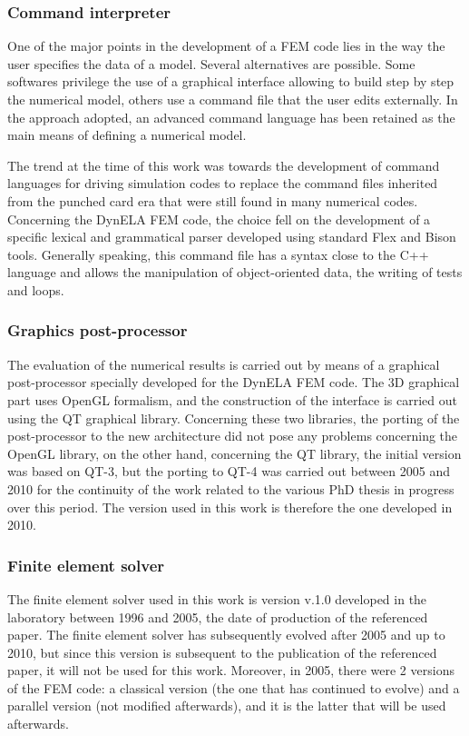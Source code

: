 \subsubsection{Command interpreter}
One of the major points in the development of a FEM code lies in the way the user specifies the data of a model. Several alternatives are possible. Some softwares privilege the use of a graphical interface allowing to build step by step the numerical model, others use a command file that the user edits externally. In the approach adopted, an advanced command language has been retained as the main means of defining a numerical model. 

The trend at the time of this work was towards the development of command languages for driving simulation codes to replace the command files inherited from the punched card era that were still found in many numerical codes. Concerning the DynELA FEM code, the choice fell on the development of a specific lexical and grammatical parser developed using standard Flex and Bison tools. Generally speaking, this command file has a syntax close to the C++ language and allows the manipulation of object-oriented data, the writing of tests and loops. 
 
\subsubsection{Graphics post-processor}

The evaluation of the numerical results is carried out by means of a graphical post-processor specially developed for the DynELA FEM code. The 3D graphical part uses OpenGL formalism, and the construction of the interface is carried out using the QT graphical library. Concerning these two libraries, the porting of the post-processor to the new architecture did not pose any problems concerning the OpenGL library, on the other hand, concerning the QT library, the initial version was based on QT-3, but the porting to QT-4 was carried out between 2005 and 2010 for the continuity of the work related to the various PhD thesis in progress over this period. The version used in this work is therefore the one developed in 2010.

\subsubsection{Finite element solver}

The finite element solver used in this work is version v.1.0 developed in the laboratory between 1996 and 2005, the date of production of the referenced paper. The finite element solver has subsequently evolved after 2005 and up to 2010, but since this version is subsequent to the publication of the referenced paper, it will not be used for this work. Moreover, in 2005, there were 2 versions of the FEM code: a classical version (the one that has continued to evolve) and a parallel version (not modified afterwards), and it is the latter that will be used afterwards.

